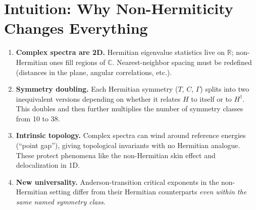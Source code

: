 \documentclass[11pt,a4paper]{article}
\begin{document}
\section{Intuition: Why Non-Hermiticity Changes Everything}
\begin{enumerate}[nosep]
  \item \textbf{Complex spectra are 2D.}  Hermitian eigenvalue statistics live on $\mathbb{R}$; non-Hermitian ones fill regions of $\mathbb{C}$.  Nearest-neighbor spacing must be redefined (distances in the plane, angular correlations, etc.).
  \item \textbf{Symmetry doubling.}  Each Hermitian symmetry ($T$, $C$, $\Gamma$) splits into two inequivalent versions depending on whether it relates $H$ to itself or to $H^\dagger$.  This doubles and then further multiplies the number of symmetry classes from 10 to 38.
  \item \textbf{Intrinsic topology.}  Complex spectra can wind around reference energies (``point gap''), giving topological invariants with no Hermitian analogue.  These protect phenomena like the non-Hermitian skin effect and delocalization in 1D.
  \item \textbf{New universality.}  Anderson-transition critical exponents in the non-Hermitian setting differ from their Hermitian counterparts \emph{even within the same named symmetry class}.
\end{enumerate}

\end{document}
